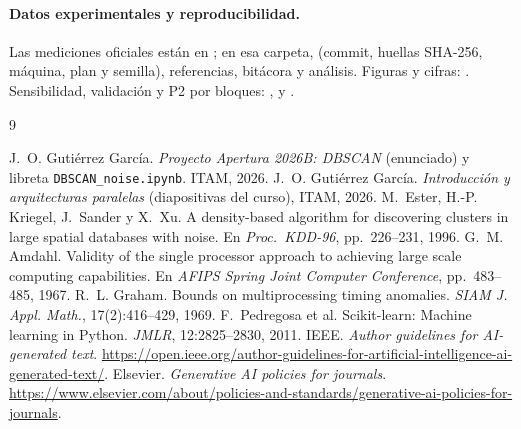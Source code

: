 \documentclass[11pt,letterpaper]{article}
\newcommand{\code}[1]{\texttt{#1}}
\begin{document}
\paragraph{Datos experimentales y reproducibilidad.} Las mediciones oficiales están en
; en esa carpeta,  (commit, huellas
SHA-256, máquina, plan y semilla), referencias, bitácora y análisis. Figuras y cifras:
. Sensibilidad, validación y P2 por bloques: ,
 y .

\begin{thebibliography}{9}\footnotesize\raggedright
\setlength{\itemsep}{0pt}
 J.~O. Gutiérrez García. \emph{Proyecto Apertura 2026B: DBSCAN} (enunciado) y libreta
\code{DBSCAN\_noise.ipynb}. ITAM, 2026.
 J.~O. Gutiérrez García. \emph{Introducción y arquitecturas paralelas} (diapositivas del curso),
ITAM, 2026.
 M.~Ester, H.-P. Kriegel, J.~Sander y X.~Xu. A density-based algorithm for discovering clusters
in large spatial databases with noise. En \emph{Proc.\ KDD-96}, pp.~226--231, 1996.
 G.~M. Amdahl. Validity of the single processor approach to achieving large scale computing
capabilities. En \emph{AFIPS Spring Joint Computer Conference}, pp.~483--485, 1967.
 R.~L. Graham. Bounds on multiprocessing timing anomalies. \emph{SIAM J. Appl. Math.},
17(2):416--429, 1969.
 F.~Pedregosa et al. Scikit-learn: Machine learning in Python. \emph{JMLR}, 12:2825--2830, 2011.
 IEEE. \emph{Author guidelines for AI-generated text}. \url{https://open.ieee.org/author-guidelines-for-artificial-intelligence-ai-generated-text/}.
 Elsevier. \emph{Generative AI policies for journals}. \url{https://www.elsevier.com/about/policies-and-standards/generative-ai-policies-for-journals}.
\end{thebibliography}
\end{document}
